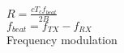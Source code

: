 \documentclass[preview]{standalone}
\begin{document}
$R = \frac{c T_{c} f_{beat}}{2 B}$\\$f_{beat} = f_{TX} - f_{RX}$\\Frequency modulation\\
\end{document}
